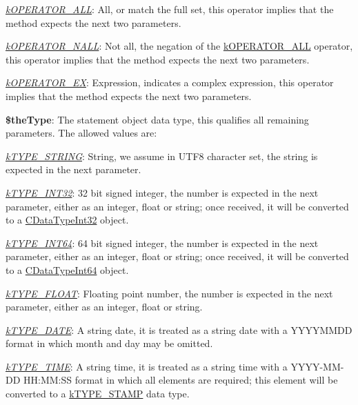 \begin{DoxyItemize}
\begin{DoxyItemize}
\item {\itshape \hyperlink{}{k\-O\-P\-E\-R\-A\-T\-O\-R\-\_\-\-A\-L\-L}}\-: All, or match the full set, this operator implies that the method expects the next two parameters. 
\item {\itshape \hyperlink{}{k\-O\-P\-E\-R\-A\-T\-O\-R\-\_\-\-N\-A\-L\-L}}\-: Not all, the negation of the \hyperlink{}{k\-O\-P\-E\-R\-A\-T\-O\-R\-\_\-\-A\-L\-L} operator, this operator implies that the method expects the next two parameters. 
\item {\itshape \hyperlink{}{k\-O\-P\-E\-R\-A\-T\-O\-R\-\_\-\-E\-X}}\-: Expression, indicates a complex expression, this operator implies that the method expects the next two parameters. 
\end{DoxyItemize}
\item {\bfseries \$the\-Type}\-: The statement object data type, this qualifies all remaining parameters. The allowed values are\-: 
\begin{DoxyItemize}
\item {\itshape \hyperlink{}{k\-T\-Y\-P\-E\-\_\-\-S\-T\-R\-I\-N\-G}}\-: String, we assume in U\-T\-F8 character set, the string is expected in the next parameter. 
\item {\itshape \hyperlink{}{k\-T\-Y\-P\-E\-\_\-\-I\-N\-T32}}\-: 32 bit signed integer, the number is expected in the next parameter, either as an integer, float or string; once received, it will be converted to a \hyperlink{class_c_data_type_int32}{C\-Data\-Type\-Int32} object. 
\item {\itshape \hyperlink{}{k\-T\-Y\-P\-E\-\_\-\-I\-N\-T64}}\-: 64 bit signed integer, the number is expected in the next parameter, either as an integer, float or string; once received, it will be converted to a \hyperlink{class_c_data_type_int64}{C\-Data\-Type\-Int64} object. 
\item {\itshape \hyperlink{}{k\-T\-Y\-P\-E\-\_\-\-F\-L\-O\-A\-T}}\-: Floating point number, the number is expected in the next parameter, either as an integer, float or string. 
\item {\itshape \hyperlink{}{k\-T\-Y\-P\-E\-\_\-\-D\-A\-T\-E}}\-: A string date, it is treated as a string date with a Y\-Y\-Y\-Y\-M\-M\-D\-D format in which month and day may be omitted. 
\item {\itshape \hyperlink{}{k\-T\-Y\-P\-E\-\_\-\-T\-I\-M\-E}}\-: A string time, it is treated as a string time with a Y\-Y\-Y\-Y-\/\-M\-M-\/\-D\-D H\-H\-:\-M\-M\-:S\-S format in which all elements are required; this element will be converted to a \hyperlink{}{k\-T\-Y\-P\-E\-\_\-\-S\-T\-A\-M\-P} data type. 

\end{DoxyItemize}
\end{DoxyItemize}
